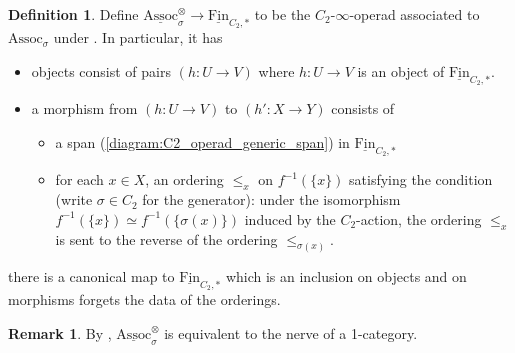 \documentclass{article}
\newcommand{\Assoc}{\mathrm{Assoc}}
\theoremstyle{definition}
\newtheorem{definition}[equation]{Definition}
\newtheorem{remark}[equation]{Remark}
\begin{document}
\begin{definition}\label{defn:gen_alg_inv_param_operad}
    Define $ \underline{\Assoc}_{\sigma}^\otimes \to \underline{\mathrm{Fin}}_{C_2, *} $ to be the $ C_2 $-$ \infty $-operad associated to $ \mathbf{\Assoc}_{\sigma} $ under \cite[Construction 2.5.5 \& Proposition 2.5.6]{NS22}. 
    In particular, it has 
    \begin{itemize}
        \item objects consist of pairs $ (h : U \to V) $ where $ h: U \to V $ is an object of $ \underline{\mathrm{Fin}}_{C_2, *} $.  
        \item a morphism from $ (h : U \to V) $ to $ (h' : X \to Y) $ consists of 
        \begin{itemize}
            \item a span (\ref{diagram:C2_operad_generic_span}) in $ \underline{\mathrm{Fin}}_{C_2, *} $
            \item for each $ x \in X $, an ordering $ \leq_x $ on $ f^{-1}(\{x\}) $ satisfying the condition (write $ \sigma \in C_2 $ for the generator): under the isomorphism $ f^{-1}(\{x\}) \simeq f^{-1}(\{\sigma(x)\}) $ induced by the $ C_2 $-action, the ordering $ \leq_x $ is sent to the reverse of the ordering $ \leq_{\sigma(x)} $.  
        \end{itemize} 
    \end{itemize}
    there is a canonical map to $ \underline{\mathrm{Fin}}_{C_2, *} $ which is an inclusion on objects and on morphisms forgets the data of the orderings. 
\end{definition}
\begin{remark}
    By \cite[Construction 2.5.5 \& Proposition 2.5.6]{NS22}, $ \underline{\Assoc}_{\sigma}^\otimes $ is equivalent to the nerve of a 1-category.     
\end{remark}
\end{document}
